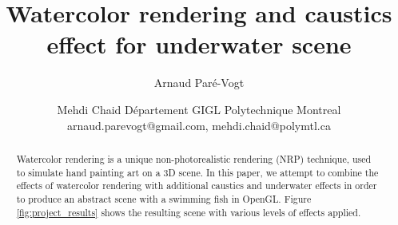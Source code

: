 \documentclass{article}
\title{Watercolor rendering and caustics effect for underwater scene} %
\author{
Arnaud Paré-Vogt
\and
Mehdi Chaid
\affiliations
Département GIGL Polytechnique Montreal\\
\emails
arnaud.parevogt@gmail.com, %
mehdi.chaid@polymtl.ca
}
\begin{document}
\makeatletter
\g@addto@macro{}
\makeatother
\maketitle

\begin{abstract}
Watercolor rendering is a unique non-photorealistic rendering (NRP) technique, 
used to simulate hand painting art on a 3D scene. In this paper, we attempt to
combine the effects of watercolor rendering with additional caustics and underwater
effects in order to produce an abstract scene with a swimming fish in OpenGL. 
Figure \ref{fig:project_results} shows the resulting scene with various levels of effects applied.

\end{abstract}
\end{document}
